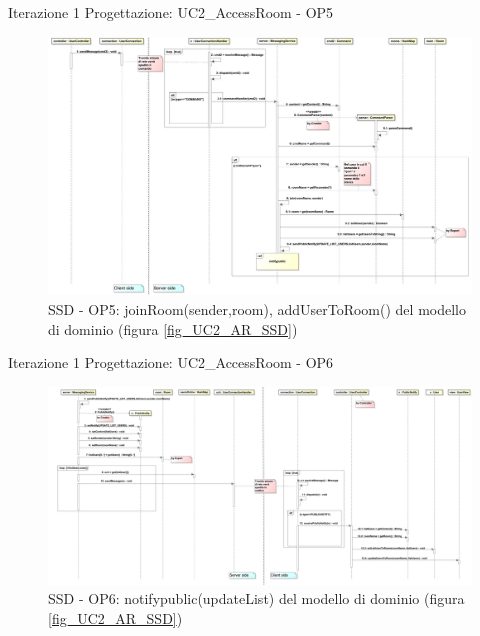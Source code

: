 \documentclass[t]{beamer} %
\begin{document}
\begin{frame} {Iterazione 1 Progettazione: UC2\_AccessRoom - OP5}
   \begin{figure}
     \includegraphics[scale=0.138]{image_astah/Iteration_1_DesignModel/UC2_AccessRoom_SSD_5_join_add.png}{\centering}
     \caption{SSD - OP5: joinRoom(sender,room), addUserToRoom() del modello di dominio (figura \ref{fig_UC2_AR_SSD}) }
     \label{fig_UC2_SSD_AC_5} 
   \end{figure}
\end{frame}

\begin{frame} {Iterazione 1 Progettazione: UC2\_AccessRoom - OP6}
   \begin{figure}
     \includegraphics[scale=0.16]{image_astah/Iteration_1_DesignModel/UC2_AccessRoom_SSD_6_notifypublic.png}{\centering}
     \caption{SSD - OP6: notifypublic(updateList) del modello di dominio (figura \ref{fig_UC2_AR_SSD}) }
     \label{fig_UC2_SSD_AC_6} 
   \end{figure}
\end{frame}
\end{document}
